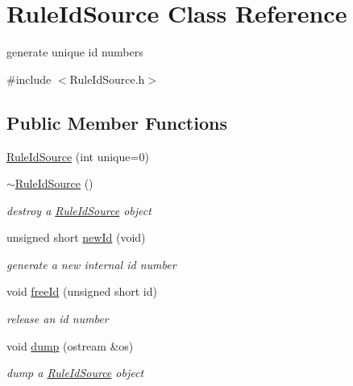 \hypertarget{classRuleIdSource}{}\section{Rule\+Id\+Source Class Reference}
\label{classRuleIdSource}


generate unique id numbers  




{\ttfamily \#include $<$Rule\+Id\+Source.\+h$>$}

\subsection*{Public Member Functions}
\begin{DoxyCompactItemize}
\item 
\hyperlink{classRuleIdSource_aae6bfb7f53dc67d7a2700736c330c443}{Rule\+Id\+Source} (int unique=0)
\item 
\mbox{\label{classRuleIdSource_a6fb34a092990296a8998cb5877adcec3}} 
\hyperlink{classRuleIdSource_a6fb34a092990296a8998cb5877adcec3}{$\sim$\+Rule\+Id\+Source} ()
\begin{DoxyCompactList}\small\item\em destroy a \hyperlink{classRuleIdSource}{Rule\+Id\+Source} object \end{DoxyCompactList}\item 
unsigned short \hyperlink{classRuleIdSource_a1c4a3c9ff759ed7b4ba77f3331e1b7d0}{new\+Id} (void)
\begin{DoxyCompactList}\small\item\em generate a new internal id number \end{DoxyCompactList}\item 
void \hyperlink{classRuleIdSource_a81879127eea335cb4722c42915e4712e}{free\+Id} (unsigned short id)
\begin{DoxyCompactList}\small\item\em release an id number \end{DoxyCompactList}\item 
\mbox{\label{classRuleIdSource_a5127a27a536916b11a7becc6921c929c}} 
void \hyperlink{classRuleIdSource_a5127a27a536916b11a7becc6921c929c}{dump} (ostream \&os)
\begin{DoxyCompactList}\small\item\em dump a \hyperlink{classRuleIdSource}{Rule\+Id\+Source} object \end{DoxyCompactList}\end{DoxyCompactItemize}


